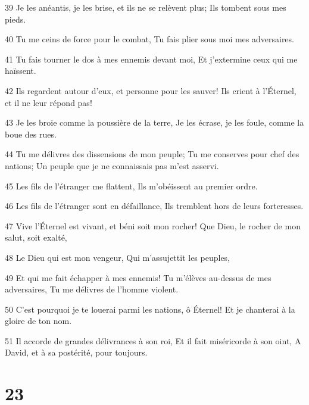\par 39 Je les anéantis, je les brise, et ils ne se relèvent plus; Ils tombent sous mes pieds.
\par 40 Tu me ceins de force pour le combat, Tu fais plier sous moi mes adversaires.
\par 41 Tu fais tourner le dos à mes ennemis devant moi, Et j'extermine ceux qui me haïssent.
\par 42 Ils regardent autour d'eux, et personne pour les sauver! Ils crient à l'Éternel, et il ne leur répond pas!
\par 43 Je les broie comme la poussière de la terre, Je les écrase, je les foule, comme la boue des rues.
\par 44 Tu me délivres des dissensions de mon peuple; Tu me conserves pour chef des nations; Un peuple que je ne connaissais pas m'est asservi.
\par 45 Les fils de l'étranger me flattent, Ils m'obéissent au premier ordre.
\par 46 Les fils de l'étranger sont en défaillance, Ils tremblent hors de leurs forteresses.
\par 47 Vive l'Éternel est vivant, et béni soit mon rocher! Que Dieu, le rocher de mon salut, soit exalté,
\par 48 Le Dieu qui est mon vengeur, Qui m'assujettit les peuples,
\par 49 Et qui me fait échapper à mes ennemis! Tu m'élèves au-dessus de mes adversaires, Tu me délivres de l'homme violent.
\par 50 C'est pourquoi je te louerai parmi les nations, ô Éternel! Et je chanterai à la gloire de ton nom.
\par 51 Il accorde de grandes délivrances à son roi, Et il fait miséricorde à son oint, A David, et à sa postérité, pour toujours.

\chapter{23}


